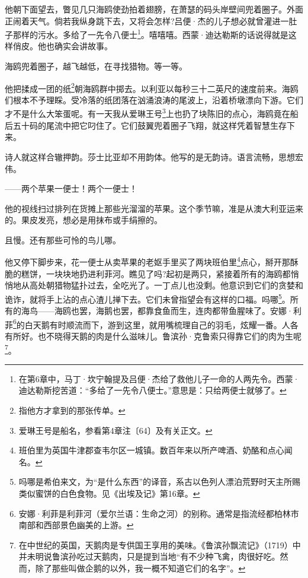 \par 他朝下面望去，瞥见几只海鸥使劲拍着翅膀，在萧瑟的码头岸壁间兜着圈子。外面正闹着天气。倘若我纵身跳下去，又将会怎样?吕便·杰的儿子想必就曾灌进一肚子那样的污水。多给了一先令八便士\footnote{在第6章中，马丁·坎宁翰提及吕便·杰给了救他儿子一命的人两先令。西蒙·迪达勒斯挖苦道：“多给了一先令八便士。”意思是：只给两便士就够了。}。嘻嘻嘻。西蒙·迪达勒斯的话说得就是这样俏皮。他也确实会讲故事。
\par 海鸥兜着圈子，越飞越低，在寻找猎物。等一等。
\par 他把揉成一团的纸\footnote{指他方才拿到的那张传单。}朝海鸥群中掷去。以利亚以每秒三十二英尺的速度前来。海鸥们根本不予理睬。受冷落的纸团落在汹涌浪涛的尾波上，沿着桥墩漂向下游。它们才不是什么大笨蛋呢。有一天我从爱琳王号\footnote{爱琳王号是船名，参看第4章注〔64〕及有关正文。}上也扔了块陈旧的点心，海鸥竟在船后五十码的尾流中把它叼住了。它们鼓翼兜着圈子飞翔，就这样凭着智慧生存下来。
\par 诗人就这样合辙押韵。莎士比亚却不用韵体。他写的是无韵诗。语言流畅，思想宏伟。
\par ——两个苹果一便士！两个一便士！
\par 他的视线扫过排列在货摊上那些光溜溜的苹果。这个季节嘛，准是从澳大利亚运来的。果皮发亮，想必是用抹布或手绢擦的。
\par 且慢。还有那些可怜的鸟儿哪。
\par 他又停下脚步来，花一便士从卖苹果的老妪手里买了两块班伯里\footnote{班伯里为英国牛津郡查韦尔区一城镇。数百年来以所产啤酒、奶酪和点心闻名。}点心，掰开那酥脆的糕饼，一块块地扔进利菲河。瞧见了吗?起初是两只，紧接着所有的海鸥都悄悄地从高处朝猎物猛扑过去，全吃光了。一丁点儿也没剩。他意识到它们的贪婪和诡诈，就将手上沾的点心渣儿掸下去。它们未曾指望会有这样的口福。吗哪\footnote{吗哪是希伯来文，为“是什么东西”的译音，系古以色列人漂泊荒野时天主所赐类似蜜饼的白色食物。见《出埃及记》第16章。}。所有的海鸟——海鸥也罢，海鹅也罢，都靠食鱼而生，连肉都带鱼腥味了。安娜·利菲\footnote{安娜·利菲是利菲河（爱尔兰语：生命之河）的别称。通常是指流经都柏林市南部和西部景色幽美的上游。}的白天鹅有时顺流而下，游到这里，就用嘴梳理自己的羽毛，炫耀一番。人各有所好。也不晓得天鹅的肉是什么滋味儿。鲁滨孙·克鲁索只得靠它们的肉为生呢\footnote{在中世纪的英国，天鹅肉是专供国王享用的美味。《鲁滨孙飘流记》（1719）中并未明说鲁滨孙吃过天鹅肉，只是提到当地“有不少种飞禽，肉很好吃。然而，除了那些叫做企鹅的以外，我一概不知道它们的名字”。}。
